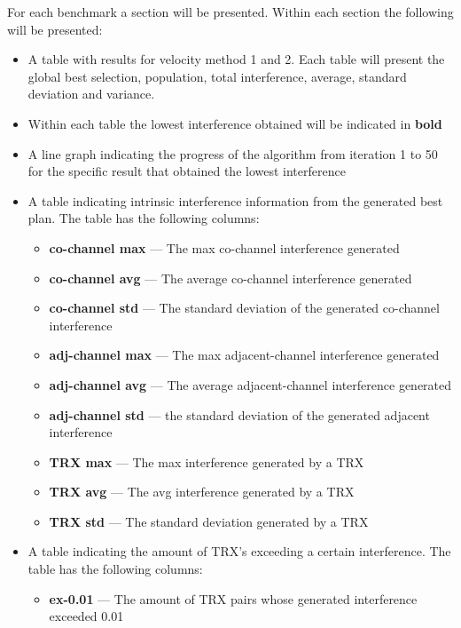 For each benchmark a section will be presented. Within each section the following will be presented:
\begin{itemize}
        \item A table with results for velocity method 1 and 2. Each table will present the global best selection, population, total interference, average, standard deviation and variance.
        \item Within each table the lowest interference obtained will be indicated in \textbf{bold}
        \item A line graph indicating the progress of the algorithm from iteration 1 to 50 for the specific result that obtained the lowest interference
        \item A table indicating intrinsic interference information from the generated best plan. The table has the following columns:
            \begin{itemize}
                \item{\textbf{co-channel max}} --- The max co-channel interference generated
                \item{\textbf{co-channel avg}} --- The average co-channel interference generated
                \item{\textbf{co-channel std}} --- The standard deviation of the generated co-channel interference
                \item{\textbf{adj-channel max}} --- The max adjacent-channel interference generated
                \item{\textbf{adj-channel avg}} --- The average adjacent-channel interference generated
                \item{\textbf{adj-channel std}} --- the standard deviation of the generated adjacent interference
                \item{\textbf{TRX max}} --- The max interference generated by a TRX
                \item{\textbf{TRX avg}} --- The avg interference generated by a TRX
                \item{\textbf{TRX std}} --- The standard deviation generated by a TRX
            \end{itemize}
        \item A table indicating the amount of TRX's exceeding a certain interference. The table has the following columns:
            \begin{itemize}
                \item{\textbf{ex-0.01}} --- The amount of TRX pairs whose generated interference exceeded 0.01

\end{itemize}
\end{itemize}
